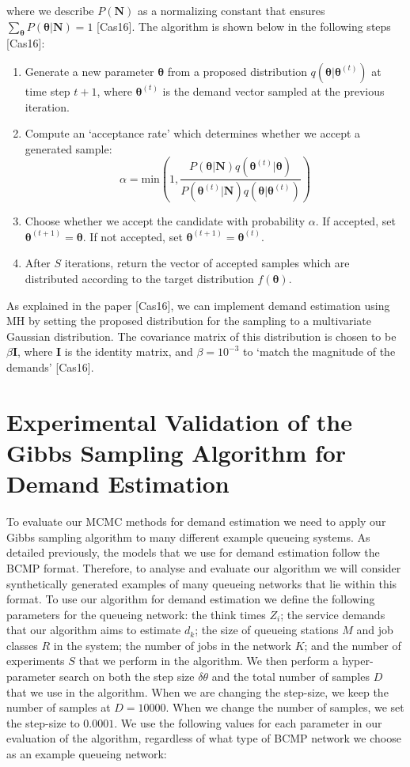 \documentclass[a4paper,11pt,titlepage]{article}
\begin{document}
where we describe $P(\mathbf{N})$ as a normalizing constant that ensures $\sum_{\bm{\theta}} P(\bm{\theta}|\mathbf{N}) = 1$ [Cas16]. The algorithm is shown below in the following steps [Cas16]: 

\begin{enumerate}
    \item Generate a new parameter $\bm{\theta}$ from  a proposed distribution $q(\bm{\theta}|\bm{\theta}^{(t)})$ at time step $t+1$, where $\bm{\theta}^{(t)}$ is the demand vector sampled at the previous iteration.
    \item Compute an `acceptance rate' which determines whether we accept a generated sample: $$\alpha = \text{min} \left(1, \frac{P(\bm{\theta}|\mathbf{N}) q(\bm{\theta}^{(t)}|\bm{\theta})}{P(\bm{\theta}^{(t)}|\mathbf{N}) q(\bm{\theta}|\bm{\theta}^{(t)})} \right)$$
    \item Choose whether we accept the candidate with probability $\alpha$. If accepted, set $\bm{\theta}^{(t+1)} = \bm{\theta}$. If not accepted, set $\bm{\theta}^{(t+1)} = \bm{\theta}^{(t)}$. 
    \item After $S$ iterations, return the vector of accepted samples which are distributed according to the target distribution $f(\bm{\theta})$. 
\end{enumerate}
    
As explained in the paper [Cas16], we can implement demand estimation using MH by setting the proposed distribution for the sampling to a multivariate Gaussian distribution. The covariance matrix of this distribution is chosen to be $\beta \mathbf{I}$, where $\mathbf{I}$ is the identity matrix, and $\beta = 10^{-3}$ to `match the magnitude of the demands' [Cas16].


\section{Experimental Validation of the Gibbs Sampling Algorithm for Demand Estimation}

To evaluate our MCMC methods for demand estimation we need to apply our Gibbs sampling algorithm to many different example queueing systems. As detailed previously, the models that we use for demand estimation follow the BCMP format. Therefore, to analyse and evaluate our algorithm we will consider synthetically generated examples of many queueing networks that lie within this format. To use our algorithm for demand estimation we define the following parameters for the queueing network: the think times $Z_i$; the service demands that our algorithm aims to estimate $d_k$; the size of queueing stations $M$ and job classes $R$ in the system; the number of jobs in the network $K$; and the number of experiments $S$ that we perform in the algorithm. We then perform a hyper-parameter search on both the step size $\delta \theta$ and the total number of samples $D$ that we use in the algorithm. When we are changing the step-size, we keep the number of samples at $D = 10000$. When we change the number of samples, we set the step-size to $0.0001$. We use the following values for each parameter in our evaluation of the algorithm, regardless of what type of BCMP network we choose as an example queueing network: 
\end{document}
